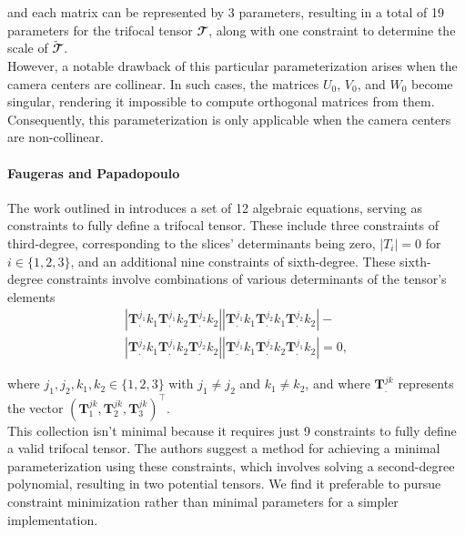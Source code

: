 and each matrix can be represented by 3 parameters, resulting in a total of 19 parameters for the trifocal tensor \( \mathbfcal{T} \), along with one constraint to determine the scale of \( \bm{\widetilde{\mathbfcal{T}}} \).\\

However, a notable drawback of this particular parameterization arises when the camera centers are collinear. In such cases, the matrices \( U_0 \), \( V_0 \), and \( W_0 \) become singular, rendering it impossible to compute orthogonal matrices from them. Consequently, this parameterization is only applicable when the camera centers are non-collinear.

\paragraph{Faugeras and Papadopoulo}
The work outlined in \cite{7-faugeras-papadopoulo-param} introduces a set of 12 algebraic equations, serving as constraints to fully define a trifocal tensor. These include three constraints of third-degree, corresponding to the slices' determinants being zero, \( |T_i| = 0 \) for \( i \in \{1, 2, 3\} \), and an additional nine constraints of sixth-degree. These sixth-degree constraints involve combinations of various determinants of the tensor's elements
\begin{equation}
	\begin{gathered}
		| \bm{T}_.^{j_1}{k_1}\bm{T}_.^{j_1}{k_2}\bm{T}_.^{j_2}{k_2} | | \bm{T}_.^{j_1}{k_1}\bm{T}_.^{j_2}{k_1}\bm{T}_.^{j_2}{k_2} | -\\
		| \bm{T}_.^{j_2}{k_1}\bm{T}_.^{j_1}{k_2}\bm{T}_.^{j_2}{k_2} | | \bm{T}_.^{j_1}{k_1}\bm{T}_.^{j_2}{k_2}\bm{T}_.^{j_1}{k_2} | = 0,
	\end{gathered}
\end{equation}

where \( j_1, j_2, k_1, k_2 \in \{1, 2, 3\} \) with \( j_1 \neq j_2 \) and \( k_1 \neq k_2 \), and where \( \bm{T}_.^{jk} \) represents the vector \( (\bm{T}_1^{jk}, \bm{T}_2^{jk}, \bm{T}_3^{jk})^\top \).\\

This collection isn't minimal because it requires just 9 constraints to fully define a valid trifocal tensor. The authors suggest a method for achieving a minimal parameterization using these constraints, which involves solving a second-degree polynomial, resulting in two potential tensors. We find it preferable to pursue constraint minimization rather than minimal parameters for a simpler implementation.


